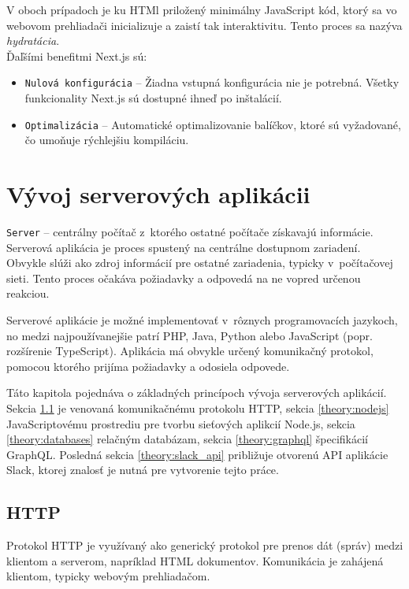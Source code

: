 \noindent V oboch prípadoch je ku HTMl priložený minimálny JavaScript kód, ktorý sa vo webovom prehliadači inicializuje a zaistí tak interaktivitu. Tento proces sa nazýva \emph{hydratácia}. \cite{NextJS} \\

\noindent Ďaľšími benefitmi Next.js sú:
\begin{itemize}
	\item \texttt{Nulová konfigurácia} -- Žiadna vstupná konfigurácia nie je potrebná. Všetky funkcionality Next.js sú dostupné ihneď po inštalácií. \cite{NextJS}
	\item \texttt{Optimalizácia} -- Automatické optimalizovanie balíčkov, ktoré sú vyžadované, čo umoňuje rýchlejšiu kompiláciu. \cite{NextJS}
\end{itemize}

\chapter{Vývoj serverových aplikácii}
\label{theory:server_dev}
\texttt{Server} -- centrálny počítač z~ktorého ostatné počítače získavajú informácie. \cite{CamDict} \\

\noindent Serverová aplikácia je proces spustený na centrálne dostupnom zariadení. Obvykle slúži ako zdroj informácií pre ostatné zariadenia, typicky v~počítačovej sieti. Tento proces očakáva požiadavky a odpovedá na ne vopred určenou reakciou.

Serverové aplikácie je možné implementovať v~rôznych programovacích jazykoch, no medzi najpoužívanejšie patrí PHP, Java, Python alebo JavaScript (popr. rozšírenie TypeScript). Aplikácia má obvykle určený komunikačný protokol, pomocou ktorého prijíma požiadavky a odosiela odpovede.

Táto kapitola pojednáva o základných princípoch vývoja serverových aplikácií. Sekcia \ref{theory:HTTP} je venovaná komunikačnému protokolu HTTP, sekcia \ref{theory:nodejs} JavaScriptovému prostrediu pre tvorbu sieťových aplikcií Node.js, sekcia \ref{theory:databases} relačným databázam, sekcia \ref{theory:graphql} špecifikácií GraphQL. Posledná sekcia \ref{theory:slack_api} približuje otvorenú API aplikácie Slack, ktorej znalosť je nutná pre vytvorenie tejto práce.

\section{HTTP}
\label{theory:HTTP}
Protokol HTTP je využívaný ako generický protokol pre prenos dát (správ) medzi klientom a serverom, napríklad HTML dokumentov. Komunikácia je zahájená klientom, typicky webovým prehliadačom.

